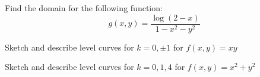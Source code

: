\documentclass[addpoints]{exam}
\begin{document}
\begin{questions}
\question[20]  Find the domain for the following function:
\[
	g(x,y) = \frac{\log (2 - x)}{1 - x^2 - y^2}
\]  

\question[20] Sketch and describe level curves for $k = 0, \pm 1$ for $f(x,y) = xy$

\question[20] Sketch and describe level curves for $k = 0, 1, 4$ for $f(x,y) = x^2 + y^2$





\end{questions}
\end{document}
